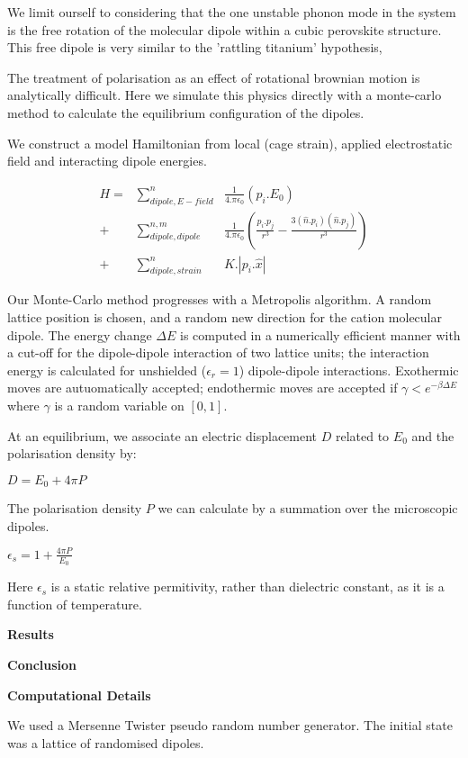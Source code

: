 \documentclass[journal=jacsat,manuscript=communication]{achemso}
\begin{document}
We limit ourself to considering that the one unstable phonon mode in the system is the free rotation of the molecular dipole within a cubic perovskite structure. This free dipole is very similar to the 'rattling titanium' hypothesis, 

The treatment of polarisation as an effect of rotational brownian motion is analytically difficult\cite{mcconnell_rotational_1980}.
Here we simulate this physics directly with a monte-carlo method to calculate the equilibrium configuration of the dipoles.

We construct a model Hamiltonian from local (cage strain), applied electrostatic field and interacting dipole energies.

\begin{align}
H = &\sum^n_{dipole,E-field} &\frac{1}{4.\pi \epsilon_0} (p_i.E_0) \\
+ &\sum^{n,m}_{dipole,dipole} &\frac{1}{4.\pi \epsilon_0} (\frac{p_i.p_j}{r^3}-\frac{3(\hat{n}.p_i)(\hat{n}.p_j)}{r^3}) \\
+ &\sum^n_{dipole,strain} &K.|p_i.\hat{x}|
\end{align}  

Our Monte-Carlo method progresses with a Metropolis algorithm. 
A random lattice position is chosen, and a random new direction for the cation molecular dipole. 
The energy change $\Delta E$ is computed in a numerically efficient manner with a cut-off for the dipole-dipole interaction of two lattice units; the interaction energy is calculated for unshielded ($\epsilon_r =1$) dipole-dipole interactions. 
Exothermic moves are autuomatically accepted; endothermic moves are accepted if $\gamma < e^{-\beta \Delta E}$ where $\gamma$ is a random variable on $[0,1]$.

At an equilibrium, we associate an electric displacement $D$ related to $E_0$ and the polarisation density by:

$D =  E_0 + 4\pi P$

The polarisation density $P$ we can calculate by a summation over the microscopic dipoles. 

$\epsilon_s = 1+ \frac{4\pi P}{E_0}$

Here $\epsilon_s$ is a static relative permitivity, rather than dielectric constant, as it is a function of temperature.


\textbf{Results}

\textbf{Conclusion}

\textbf{Computational Details}

We used a Mersenne Twister\cite{matsumoto_mersenne_1998} pseudo random number generator. The initial state was a lattice of randomised dipoles.
\end{document}
